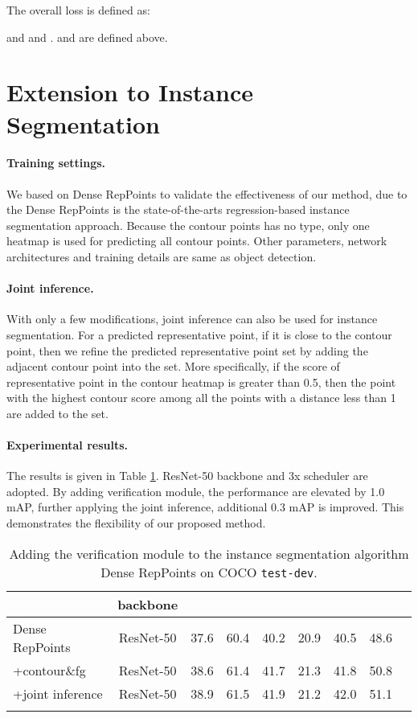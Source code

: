 \documentclass{article}
\begin{document}
The overall loss is defined as:



and  and .  and  are defined above.

\section{Extension to Instance Segmentation} \label{sec:insseg}

\paragraph{Training settings.} We based on Dense RepPoints \cite{yang19densereppts} to validate the effectiveness of our method, due to the Dense RepPoints is the state-of-the-arts regression-based instance segmentation approach. Because the contour points has no type, only one heatmap is used for predicting all contour points. Other parameters, network architectures and training details are same as object detection.

\paragraph{Joint inference.} With only a few modifications, joint inference can also be used for instance segmentation. For a predicted representative point, if it is close to the contour point, then we refine the predicted representative point set by adding the adjacent contour point into the set. More specifically, if the score of representative point in the contour heatmap is greater than 0.5, then the point with the highest contour score among all the points with a distance less than 1 are added to the set.

\paragraph{Experimental results.} The results is given in Table \ref{tab:inssegapp}. ResNet-50 backbone and 3x scheduler are adopted. By adding verification module, the performance are elevated by 1.0 mAP, further applying the joint inference, additional 0.3 mAP is improved. This demonstrates the flexibility of our proposed method.

\begin{table}
  \vspace{-0.5em}
  \caption{Adding the verification module to the instance segmentation algorithm Dense RepPoints on COCO \texttt{test-dev}.}
  \small
  \label{tab:inssegapp}
  \centering
  \begin{tabular}{lcccccccc}
    \Xhline{1.0pt}
     & backbone &  &  &  &  &  & \\
    \hline
    Dense RepPoints & ResNet-50 & 37.6 & 60.4 & 40.2 & 20.9 & 40.5 & 48.6\\
    +contour\&fg & ResNet-50 & 38.6 & 61.4 & 41.7 & 21.3 & 41.8 & 50.8\\
    +joint inference & ResNet-50 & 38.9 & 61.5 & 41.9 & 21.2 & 42.0 & 51.1\\
    \Xhline{1.0pt}
  \end{tabular}
\end{table}
\end{document}
